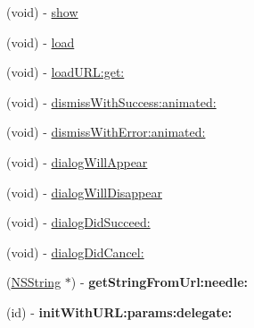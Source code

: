 \begin{DoxyCompactItemize}
\item 
(void) -\/ \hyperlink{interface_f_b_dialog_a657a94d26c8dd3dfbe60b64c6bcbf411}{show}
\item 
(void) -\/ \hyperlink{interface_f_b_dialog_a41ca6458674d1701e6e1d143d5aeb972}{load}
\item 
(void) -\/ \hyperlink{interface_f_b_dialog_a3b32355179377b16579a427e221929f4}{load\-U\-R\-L\-:get\-:}
\item 
(void) -\/ \hyperlink{interface_f_b_dialog_a29fdcc8f0a52e8008b298743d5f7df49}{dismiss\-With\-Success\-:animated\-:}
\item 
(void) -\/ \hyperlink{interface_f_b_dialog_ab28580963cd61978da74492dabce054b}{dismiss\-With\-Error\-:animated\-:}
\item 
(void) -\/ \hyperlink{interface_f_b_dialog_ad0bfcbe959e7334d076079ce3288142d}{dialog\-Will\-Appear}
\item 
(void) -\/ \hyperlink{interface_f_b_dialog_a0aaf0151353b93b543525601f9d41a83}{dialog\-Will\-Disappear}
\item 
(void) -\/ \hyperlink{interface_f_b_dialog_a038587c0962d2dbda704f151d45eb6d3}{dialog\-Did\-Succeed\-:}
\item 
(void) -\/ \hyperlink{interface_f_b_dialog_a91e729bd79578cb130cf5256e1fb2b8e}{dialog\-Did\-Cancel\-:}
\item 
\hypertarget{interface_f_b_dialog_a30c3df8ccf10cc5735d1f7d2e992f984}{
(\hyperlink{class_n_s_string}{\-N\-S\-String} $\ast$) -\/ {\bfseries get\-String\-From\-Url\-:needle\-:}}
\label{interface_f_b_dialog_a30c3df8ccf10cc5735d1f7d2e992f984}

\item 
\hypertarget{interface_f_b_dialog_aaf959b0fcd619b6b05e459983172b10c}{
(id) -\/ {\bfseries init\-With\-U\-R\-L\-:params\-:delegate\-:}}
\label{interface_f_b_dialog_aaf959b0fcd619b6b05e459983172b10c}


\end{DoxyCompactItemize}
